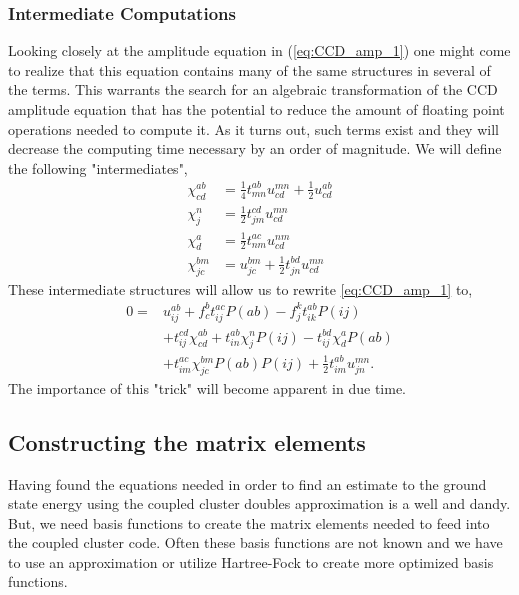 \documentclass[
    a4paper, aps, twocolumn, floatfix, superscriptaddress,
    nofootinbib]{revtex4-1}
\newcommand{\1}{\mathds{1}}
\begin{document}
        \subsubsection{Intermediate Computations}
        Looking closely at the amplitude equation in (\ref{eq:CCD_amp_1}) one might come
        to realize that this equation contains many of the same structures in
        several of the terms. This warrants the search for an algebraic transformation of the
        CCD amplitude equation that has the potential to reduce the amount of floating point
        operations needed to compute it. As it turns out, such terms exist and they will decrease
        the computing time necessary by an order of magnitude. We will define the following
        "intermediates",
        \begin{align}
            \label{eq:intermediate1}
            \chi^{ab}_{cd} &= \frac{1}{4}t^{ab}_{mn} u^{mn}_{cd} + \frac{1}{2}u^{ab}_{cd} \\
            \label{eq:intermediate2}
            \chi^n_j &= \frac{1}{2}t^{cd}_{jm} u^{mn}_{cd} \\
            \label{eq:intermediate3}
            \chi^a_d &= \frac{1}{2} t^{ac}_{nm} u^{nm}_{cd} \\
            \label{eq:intermediate4}
            \chi^{bm}_{jc} &= u^{bm}_{jc} + \frac{1}{2}t^{bd}_{jn}u^{mn}_{cd}
        \end{align}
        These intermediate structures will allow us to rewrite \autoref{eq:CCD_amp_1} to,
        \begin{equation}
        \begin{aligned}
            0 =& u^{ab}_{ij} + f^b_c t^{ac}_{ij}P(ab) - f^k_jt^{ab}_{ik}P(ij) \\
              &+ t^{cd}_{ij}\chi^{ab}_{cd} + t^{ab}_{in}\chi^n_jP(ij)
               - t^{bd}_{ij}\chi^a_dP(ab) \\
              &+ t^{ac}_{im}\chi^{bm}_{jc}P(ab)P(ij) + \frac{1}{2}t^{ab}_{im}u^{mn}_{jn}.
        \end{aligned}
        \end{equation}
        The importance of this "trick" will become apparent in due time.

    \subsection{Constructing the matrix elements}
        Having found the equations needed in order to find an estimate to the
        ground state energy using the coupled cluster doubles approximation is a
        well and dandy. But, we need basis functions to create the matrix
        elements needed to feed into the coupled cluster code.  Often these
        basis functions are not known and we have to use an approximation or
        utilize Hartree-Fock to create more optimized basis functions.
\end{document}
